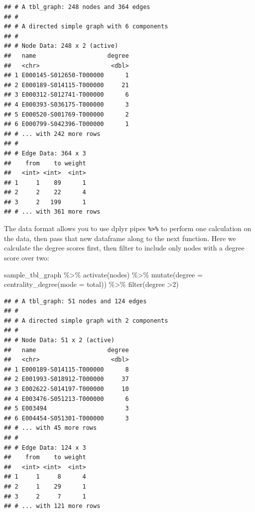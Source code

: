 \documentclass[
]{book}
\newenvironment{Shaded}{\begin{snugshade}}{\end{snugshade}}
\newcommand{\AttributeTok}[1]{\textcolor[rgb]{0.77,0.63,0.00}{#1}}
\newcommand{\DecValTok}[1]{\textcolor[rgb]{0.00,0.00,0.81}{#1}}
\newcommand{\FunctionTok}[1]{\textcolor[rgb]{0.00,0.00,0.00}{#1}}
\newcommand{\NormalTok}[1]{#1}
\newcommand{\SpecialCharTok}[1]{\textcolor[rgb]{0.00,0.00,0.00}{#1}}
\newcommand{\StringTok}[1]{\textcolor[rgb]{0.31,0.60,0.02}{#1}}
\begin{document}
\begin{verbatim}
## # A tbl_graph: 248 nodes and 364 edges
## #
## # A directed simple graph with 6 components
## #
## # Node Data: 248 x 2 (active)
##   name                    degree
##   <chr>                    <dbl>
## 1 E000145-S012650-T000000      1
## 2 E000189-S014115-T000000     21
## 3 E000312-S012741-T000000      6
## 4 E000393-S036175-T000000      3
## 5 E000520-S001769-T000000      2
## 6 E000799-S042396-T000000      1
## # ... with 242 more rows
## #
## # Edge Data: 364 x 3
##    from    to weight
##   <int> <int>  <int>
## 1     1    89      1
## 2     2    22      4
## 3     2   199      1
## # ... with 361 more rows
\end{verbatim}

The data format allows you to use dplyr pipes \texttt{\%\textgreater{}\%} to perform one calculation on the data, then pass that new dataframe along to the next function. Here we calculate the degree scores first, then filter to include only nodes with a degree score over two:

\begin{Shaded}
\begin{Highlighting}[]
\NormalTok{sample\_tbl\_graph }\SpecialCharTok{\%\textgreater{}\%} 
  \FunctionTok{activate}\NormalTok{(nodes) }\SpecialCharTok{\%\textgreater{}\%} 
  \FunctionTok{mutate}\NormalTok{(}\AttributeTok{degree =} \FunctionTok{centrality\_degree}\NormalTok{(}\AttributeTok{mode =} \StringTok{\textquotesingle{}total\textquotesingle{}}\NormalTok{)) }\SpecialCharTok{\%\textgreater{}\%} 
  \FunctionTok{filter}\NormalTok{(degree }\SpecialCharTok{\textgreater{}}\DecValTok{2}\NormalTok{)}
\end{Highlighting}
\end{Shaded}

\begin{verbatim}
## # A tbl_graph: 51 nodes and 124 edges
## #
## # A directed simple graph with 2 components
## #
## # Node Data: 51 x 2 (active)
##   name                    degree
##   <chr>                    <dbl>
## 1 E000189-S014115-T000000      8
## 2 E001993-S018912-T000000     37
## 3 E002622-S014197-T000000     10
## 4 E003476-S051213-T000000      6
## 5 E003494                      3
## 6 E004454-S051301-T000000      3
## # ... with 45 more rows
## #
## # Edge Data: 124 x 3
##    from    to weight
##   <int> <int>  <int>
## 1     1     8      4
## 2     1    29      1
## 3     2     7      1
## # ... with 121 more rows
\end{verbatim}
\end{document}

